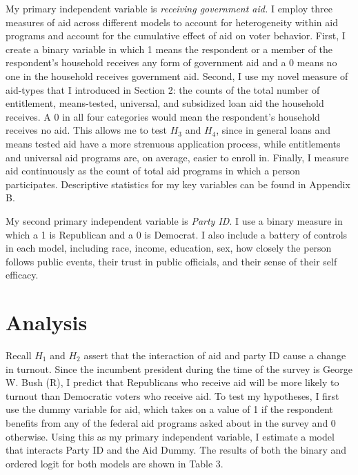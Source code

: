 \documentclass[12pt]{paper}
\begin{document}
My primary independent variable is \textit{receiving government aid.} I employ three measures of aid across different models to account for heterogeneity within aid programs and account for the cumulative effect of aid on voter behavior. First, I create a binary variable in which 1 means the respondent or a member of the respondent’s household receives any form of government aid and a 0 means no one in the household receives government aid. Second, I use my novel measure of aid-types that I introduced in Section 2: the counts of the total number of entitlement, means-tested, universal, and subsidized loan aid the household receives. A 0 in all four categories would mean the respondent’s household receives no aid. This allows me to test $H_3$ and $H_4$, since in general loans and means tested aid have a more strenuous application process, while entitlements and universal aid programs are, on average, easier to enroll in. Finally, I measure aid continuously as the count of total aid programs in which a person participates. Descriptive statistics for my key variables can be found in Appendix B.

My second primary independent variable is \textit{Party ID}. I use a binary measure in which a 1 is Republican and a 0 is Democrat. I also include a battery of controls in each model, including race, income, education, sex, how closely the person follows public events, their trust in public officials, and their sense of their self efficacy.

\section{Analysis}

Recall $H_1$ and $H_2$ assert that the interaction of aid and party ID cause a change in turnout. Since the incumbent president during the time of the survey is George W. Bush (R), I predict that Republicans who receive aid will be more likely to turnout than Democratic voters who receive aid. To test my hypotheses, I first use the dummy variable for aid, which takes on a value of 1 if the respondent benefits from any of the federal aid programs asked about in the survey and 0 otherwise. Using this as my primary independent variable, I estimate a model that interacts Party ID and the Aid Dummy. The results of both the binary and ordered logit for both models are shown in Table 3.
\end{document}
